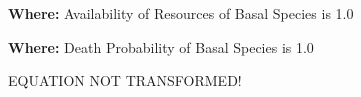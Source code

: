 \textbf{Where:} Availability of Resources of Basal Species is 1.0

%
%

\textbf{Where:} Death Probability of Basal Species is 1.0

%
%

EQUATION NOT TRANSFORMED!

%

